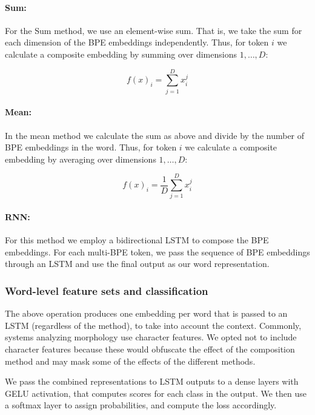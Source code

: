 \documentclass[11pt]{article}
\begin{document}
    	\paragraph{Sum:} For the Sum method, we use an element-wise
     sum. That is, we take the sum for each dimension of the BPE
     embeddings independently. Thus, for token $i$ we calculate a
     composite embedding by summing over dimensions $1,\ldots,D$:
	
	\begin{equation}
	f(x)_i = \sum_{j=1}^{D} x_i^j
	\end{equation}
	

     \paragraph{Mean:} In the mean method we calculate the sum as above and
     divide by the number of BPE embeddings in the word. Thus, for
     token $i$ we calculate a composite embedding by averaging over
     dimensions $1,\ldots,D$:
	
	\begin{equation}
	f(x)_{i} = \frac{1}{D}\sum_{j=1}^{D} x_i^j
	\end{equation}
	
	
     \paragraph{RNN:} For this method we employ a bidirectional
     LSTM to compose the BPE embeddings. For each multi-BPE token, we
     pass the sequence of BPE embeddings through an LSTM and use the
     final output as our word representation.

     \subsubsection{Word-level feature sets and classification}
     The above operation produces one embedding per word that is passed
     to an LSTM (regardless of the method), to take into account the
     context.
            Commonly, systems analyzing morphology use character
     features. We opted not to include character features because
     these would obfuscate the effect of the composition method and
     may mask some of the effects of the different methods.

            We pass the combined representations to LSTM outputs to a
     dense layers with GELU activation, that computes scores for each
     class in the output. We then use a softmax layer to assign
     probabilities, and compute the loss accordingly.
\end{document}
